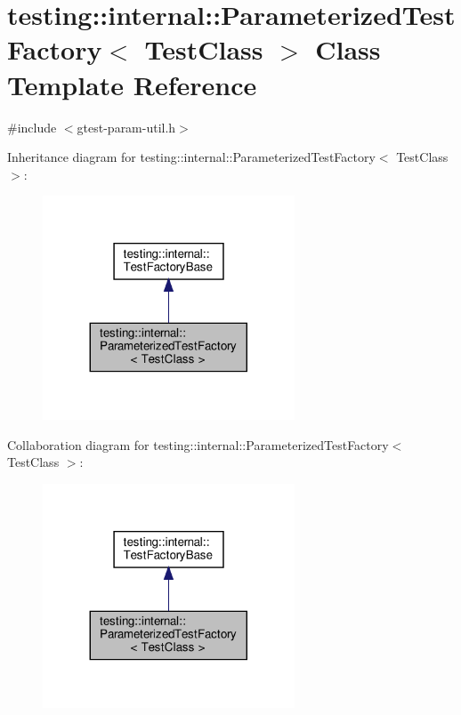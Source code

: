 \hypertarget{classtesting_1_1internal_1_1ParameterizedTestFactory}{}\section{testing\+:\+:internal\+:\+:Parameterized\+Test\+Factory$<$ Test\+Class $>$ Class Template Reference}
\label{classtesting_1_1internal_1_1ParameterizedTestFactory}


{\ttfamily \#include $<$gtest-\/param-\/util.\+h$>$}



Inheritance diagram for testing\+:\+:internal\+:\+:Parameterized\+Test\+Factory$<$ Test\+Class $>$\+:\nopagebreak
\begin{figure}[H]
\begin{center}
\leavevmode
\includegraphics[width=212pt]{classtesting_1_1internal_1_1ParameterizedTestFactory__inherit__graph}
\end{center}
\end{figure}


Collaboration diagram for testing\+:\+:internal\+:\+:Parameterized\+Test\+Factory$<$ Test\+Class $>$\+:\nopagebreak
\begin{figure}[H]
\begin{center}
\leavevmode
\includegraphics[width=212pt]{classtesting_1_1internal_1_1ParameterizedTestFactory__coll__graph}
\end{center}
\end{figure}
